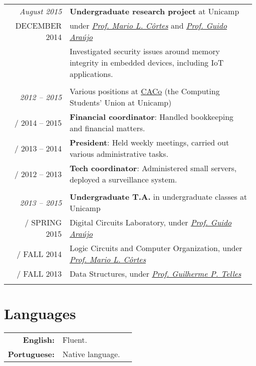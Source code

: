 \documentclass[a4paper,10pt]{article}
\makeatletter
\def\fakesc#1{%
  \begingroup%
  \xdef\fake@name{\csname\curr@fontshape/\f@size\endcsname}%
  \fontsize{\fontdimen8\fake@name}{\baselineskip}\selectfont%
  \uppercase{#1}%
  \endgroup%
}
\renewcommand{\textsc}{\fakesc}
\makeatother
\begin{document}
\begin{tabular}{r|p{11cm}}

    \emph{August 2015} & \textbf{Undergraduate research project} at Unicamp\\
  \textsc{December 2014} & under \href{http://www.ic.unicamp.br/~cortes/}{\emph{Prof. Mario L. Côrtes}} and \href{http://guidoaraujo.wordpress.com/}{\emph{Prof. Guido Araújo}}\\
                 & \footnotesize {Investigated security issues around memory integrity in embedded devices, including IoT applications.}\\
  \multicolumn{2}{c}{} \\

  \emph{2012 -- 2015} & Various positions at \href{http://www.caco.ic.unicamp.br}{CACo} \footnotesize{(the Computing Students' Union at Unicamp)} \\
  \textsc{2014 -- 2015} & \footnotesize{\textbf{Financial coordinator}: Handled bookkeeping and financial matters.}\\
  \textsc{2013 -- 2014} & \footnotesize{\textbf{President}: Held weekly meetings, carried out various administrative tasks.}\\
  \textsc{2012 -- 2013} & \footnotesize{\textbf{Tech coordinator}: Administered small servers, deployed a surveillance system.}\\
  \multicolumn{2}{c}{} \\

  \emph{2013 -- 2015} & \textbf{Undergraduate T.A.} in undergraduate classes at Unicamp \\
  \textsc{Spring 2015} & \footnotesize{Digital Circuits Laboratory, under \href{http://guidoaraujo.wordpress.com/}{\emph{Prof. Guido Araújo}}}\\
  \textsc{Fall 2014} & \footnotesize{Logic Circuits and Computer Organization, under \href{http://www.ic.unicamp.br/~cortes/}{\emph{Prof. Mario L. Côrtes}}}\\
  \textsc{Fall 2013} & \footnotesize{Data Structures, under \href{http://ic.unicamp.br/~gpt/}{\emph{Prof. Guilherme P. Telles}}}\\
  \multicolumn{2}{c}{}\\

\end{tabular}

 \section{Languages}

 \begin{tabularx}{\textwidth}{rXr}
   \textbf{English:} & Fluent. \\
   \textbf{Portuguese:} & Native language.\\
 \end{tabularx}
\end{document}
